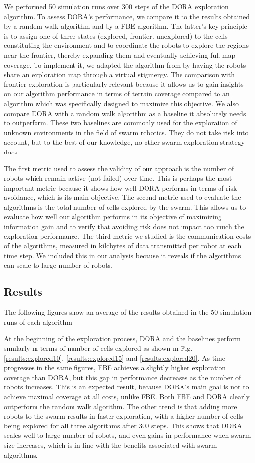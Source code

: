 \documentclass[letterpaper, 10 pt, conference]{ieeeconf}
\begin{document}
We performed 50 simulation runs over 300 steps of the DORA exploration
algorithm. To assess DORA's performance, we compare it to the results
obtained by a random walk algorithm and by a FBE algorithm. The
latter's key principle is to assign one of three states (explored,
frontier, unexplored) to the cells constituting the environment and to
coordinate the robots to explore the regions near the frontier,
thereby expanding them and eventually achieving full map coverage. To
implement it, we adapted the algorithm from
\cite{yamauchi1998frontier} by having the robots share an exploration
map through a virtual stigmergy. The comparison with frontier exploration is
particularly relevant because it allows us to gain insights on our
algorithm performance in terms of terrain coverage compared to an
algorithm which was specifically designed to maximize this
objective. We also compare DORA with a random walk algorithm as a
baseline it absolutely needs to outperform. These two baselines are
commonly used for the exploration of unknown environments in the field
of swarm robotics. They do not take risk into account, but to the best
of our knowledge, no other swarm exploration strategy does.

The first metric used to assess the validity of our approach is the
number of robots which remain active (not failed) over time. This is
perhaps the most important metric because it shows how well DORA
performs in terms of risk avoidance, which is its main objective. The
second metric used to evaluate the algorithms is the total number of
cells explored by the swarm. This allows us to evaluate how well our
algorithm performs in its objective of maximizing information gain and
to verify that avoiding risk does not impact too much the exploration
performance. The third metric we studied is the communication costs of
the algorithms, measured in kilobytes of data transmitted per robot at
each time step. We included this in our analysis because it reveals if
the algorithms can scale to large number of robots.

\subsection{Results}
The following figures show an average of the results obtained in the
50 simulation runs of each algorithm.

At the beginning of the exploration process, DORA and the baselines
perform similarly in terms of number of cells explored as shown in
Fig. \ref{results:explored10}, \ref{results:explored15} and
\ref{results:explored20}. As time progresses in the same figures, FBE
achieves a slightly higher exploration coverage than DORA, but this
gap in performance decreases as the number of robots increases. This
is an expected result, because DORA's main goal is not to achieve
maximal coverage at all costs, unlike FBE. Both FBE and DORA clearly
outperform the random walk algorithm. The other trend is that adding
more robots to the swarm results in faster exploration, with a higher
number of cells being explored for all three algorithms after 300
steps. This shows that DORA scales well to large number of robots, and
even gains in performance when swarm size increases, which is in line
with the benefits associated with swarm algorithms.
\end{document}
